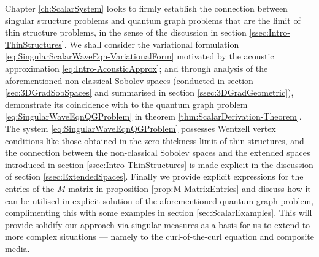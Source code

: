 Chapter \ref{ch:ScalarSystem} looks to firmly establish the connection between singular structure problems and quantum graph problems that are the limit of thin structure problems, in the sense of the discussion in section \ref{ssec:Intro-ThinStructures}.
We shall consider the variational formulation \eqref{eq:SingularScalarWaveEqn-VariationalForm} motivated by the acoustic approximation \eqref{eq:Intro-AcousticApprox}; and through analysis of the aforementioned non-classical Sobolev spaces (conducted in section \ref{sec:3DGradSobSpaces} and summarised in section \ref{ssec:3DGradGeometric}), demonstrate its coincidence with to the quantum graph problem \eqref{eq:SingularWaveEqnQGProblem} in theorem \ref{thm:ScalarDerivation-Theorem}.
The system \eqref{eq:SingularWaveEqnQGProblem} possesses Wentzell vertex conditions like those obtained in the zero thickness limit of thin-structures, and the connection between the non-classical Sobolev spaces and the extended spaces introduced in section \ref{ssec:Intro-ThinStructures} is made explicit in the discussion of section \ref{ssec:ExtendedSpaces}.
Finally we provide explicit expressions for the entries of the $M$-matrix in proposition \ref{prop:M-MatrixEntries} and discuss how it can be utilised in explicit solution of the aforementioned quantum graph problem, complimenting this with some examples in section \ref{sec:ScalarExamples}.
This will provide solidify our approach via singular measures as a basis for us to extend to more complex situations --- namely to the curl-of-the-curl equation and composite media.

